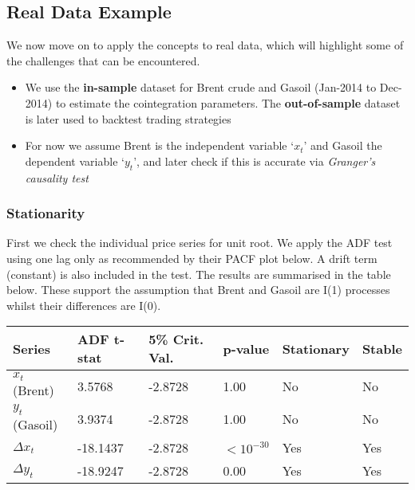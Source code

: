 \documentclass[11pt]{article}
\begin{document}
    \subsection{Real Data Example}\label{real-data-example}

    We now move on to apply the concepts to real data, which will highlight some of the challenges that can be encountered.
\begin{itemize}
\item
  We use the {\bf in-sample} dataset for Brent crude and Gasoil (Jan-2014 to
  Dec-2014) to estimate the cointegration parameters. The {\bf out-of-sample} dataset is later used to backtest trading
  strategies
\item
  For now we assume Brent is the independent variable `\(x_t\)' and Gasoil
  the dependent variable `\(y_t\)', and later check if this is accurate
  via \emph{Granger's causality test}
\end{itemize}
    \subsubsection{Stationarity}\label{stationarity}
    
First we check the individual price series for unit root. We apply the ADF test using one lag only as recommended by
their PACF plot below. A drift term (constant) is also included in the
test. The results are summarised in the table below. These support the assumption that Brent
and Gasoil are I(1) processes whilst their differences are I(0).
    \begin{longtable}[]{@{}llllll@{}}
\toprule
Series & ADF t-stat & 5\% Crit. Val. & p-value & Stationary &
Stable\tabularnewline
\midrule
\endhead
\(x_t\) (Brent) & 3.5768 & -2.8728 & 1.00 & No & No\tabularnewline
\(y_t\) (Gasoil) & 3.9374 & -2.8728 & 1.00 & No & No\tabularnewline
\(\Delta x_t\) & -18.1437 & -2.8728 & $<10^{-30}$ & Yes &
Yes\tabularnewline
\(\Delta y_t\) & -18.9247 & -2.8728 & 0.00 & Yes & Yes\tabularnewline
\bottomrule
\end{longtable}

    \begin{center}
    \end{center}
\end{document}
